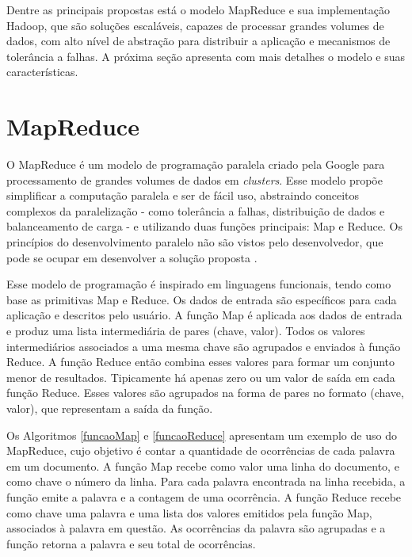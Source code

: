 Dentre as principais propostas está o modelo MapReduce e sua implementação Hadoop, que são soluções escaláveis, capazes de processar grandes volumes de dados, com alto nível de abstração para distribuir a aplicação e mecanismos de tolerância a falhas.
A próxima seção apresenta com mais detalhes o modelo e suas características.

\section{MapReduce}
O MapReduce é um modelo de programação paralela criado pela Google para processamento de grandes volumes de dados em \textit{clusters}. Esse modelo propõe simplificar a computação paralela e ser de fácil uso, abstraindo conceitos complexos da paralelização - como tolerância a falhas, distribuição de dados e balanceamento de carga - e utilizando duas funções principais: Map e Reduce. Os princípios do desenvolvimento paralelo não são vistos pelo desenvolvedor, que pode se ocupar em desenvolver a solução proposta \cite{Dean:2008}.

Esse modelo de programação é inspirado em linguagens funcionais, tendo como base as primitivas Map e Reduce.
Os dados de entrada são específicos para cada aplicação e descritos pelo usuário.
A função Map é aplicada aos dados de entrada e produz uma lista intermediária de pares (chave, valor). Todos os valores intermediários associados a uma mesma chave são agrupados e enviados à função Reduce.
A função Reduce então
combina esses valores para formar um conjunto menor de resultados.
Tipicamente há apenas zero ou um valor de saída em cada função Reduce. Esses valores são agrupados na forma de pares no formato (chave, valor), que representam a saída da função.

Os Algoritmos \ref{funcaoMap} e \ref{funcaoReduce} apresentam um exemplo de uso do MapReduce, cujo objetivo é contar a quantidade de ocorrências de cada palavra em um documento. A função Map recebe como valor uma linha do documento, e como chave o número da linha. Para cada palavra encontrada na linha recebida, a função emite a palavra e a contagem de uma ocorrência. A função Reduce recebe como chave uma palavra e uma lista dos valores emitidos pela função Map, associados à palavra em questão. As ocorrências da palavra são agrupadas e a função retorna a palavra e seu total de ocorrências.


